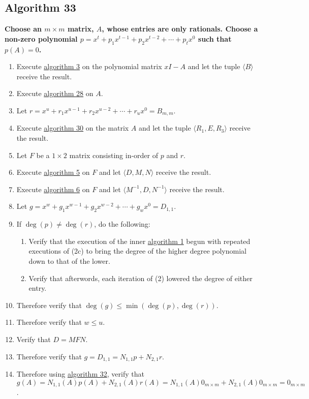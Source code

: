 \documentclass[twocolumn]{article}
\begin{document}
		\subsection{Algorithm 33}\label{sec:algorithm 33}
			\textbf{Choose an $m\times m$ matrix, $A$, whose entries are only rationals. Choose a non-zero polynomial $p=x^t+p_1x^{t-1}+p_2x^{t-2}+\cdots+p_tx^0$ such that $p(A)=0$.}
			\begin{enumerate}
				\item Execute \hyperref[sec:algorithm 3]{algorithm 3} on the polynomial matrix $xI-A$ and let the tuple $\langle B\rangle$ receive the result.
				\item Execute \hyperref[sec:algorithm 28]{algorithm 28} on $A$.
				\item Let $r=x^u+r_1x^{u-1}+r_2x^{u-2}+\cdots+r_ux^0=B_{m,m}$.
				\item Execute \hyperref[sec:algorithm 30]{algorithm 30} on the matrix $A$ and let the tuple $\langle R_1,E,R_3\rangle$ receive the result.
				\item Let $F$ be a $1\times 2$ matrix consisting in-order of $p$ and $r$.
				\item Execute \hyperref[sec:algorithm 5]{algorithm 5} on $F$ and let $\langle D,M,N\rangle$ receive the result.
				\item Execute \hyperref[sec:algorithm 6]{algorithm 6} on $F$ and let $\langle M^{-1},D,N^{-1}\rangle$ receive the result.
				\item Let $g=x^w+g_1x^{w-1}+g_2x^{w-2}+\cdots+g_wx^0=D_{1,1}$.
				\item If $\deg(p)\ne\deg(r)$, do the following:
				\begin{enumerate}
					\item Verify that the execution of the inner \hyperref[sec:algorithm 1]{algorithm 1} begun with repeated executions of (2c) to bring the degree of the higher degree polynomial down to that of the lower.
					\item Verify that afterwords, each iteration of (2) lowered the degree of either entry.
				\end{enumerate}
				\item Therefore verify that $\deg(g)\le\min(\deg(p),\deg(r))$.
				\item Therefore verify that $w\le u$.
				\item Verify that $D=MFN$.
				\item Therefore verify that $g=D_{1,1}=N_{1,1}p+N_{2,1}r$.
				\item Therefore using \hyperref[sec:algorithm 32]{algorithm 32}, verify that $g(A)=N_{1,1}(A)p(A)+N_{2,1}(A)r(A)=N_{1,1}(A)0_{m\times m}+N_{2,1}(A)0_{m\times m}=0_{m\times m}$.

\end{enumerate}
\end{document}
